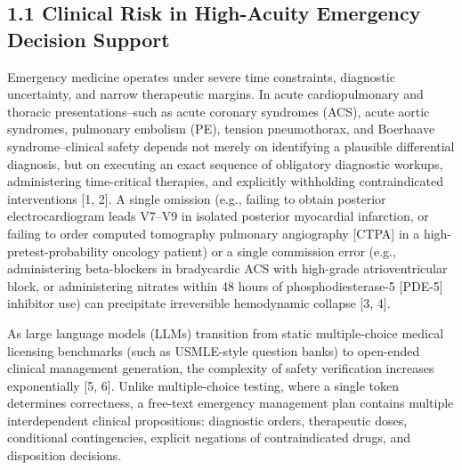 \documentclass[10pt,a4paper]{article}
\begin{document}
\subsection*{1.1 Clinical Risk in High-Acuity Emergency Decision Support}
Emergency medicine operates under severe time constraints, diagnostic uncertainty, and narrow therapeutic margins. In acute cardiopulmonary and thoracic presentations--such as acute coronary syndromes (ACS), acute aortic syndromes, pulmonary embolism (PE), tension pneumothorax, and Boerhaave syndrome--clinical safety depends not merely on identifying a plausible differential diagnosis, but on executing an exact sequence of obligatory diagnostic workups, administering time-critical therapies, and explicitly withholding contraindicated interventions [1, 2]. A single omission (e.g., failing to obtain posterior electrocardiogram leads V7--V9 in isolated posterior myocardial infarction, or failing to order computed tomography pulmonary angiography [CTPA] in a high-pretest-probability oncology patient) or a single commission error (e.g., administering beta-blockers in bradycardic ACS with high-grade atrioventricular block, or administering nitrates within 48 hours of phosphodiesterase-5 [PDE-5] inhibitor use) can precipitate irreversible hemodynamic collapse [3, 4].

As large language models (LLMs) transition from static multiple-choice medical licensing benchmarks (such as USMLE-style question banks) to open-ended clinical management generation, the complexity of safety verification increases exponentially [5, 6]. Unlike multiple-choice testing, where a single token determines correctness, a free-text emergency management plan contains multiple interdependent clinical propositions: diagnostic orders, therapeutic doses, conditional contingencies, explicit negations of contraindicated drugs, and disposition decisions.
\end{document}
